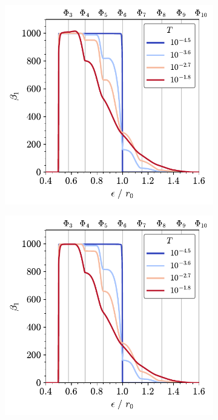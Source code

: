 \begin{figure}[tb]
	\centering
     
      \begin{subfigure}[b]{0.45\textwidth}
         \centering
         \includegraphics[width=\textwidth]{./figures/ph/tri_raft_beta1_full.pdf}
         \caption{}
         \label{fig:trbettia}
     \end{subfigure}
     \hfill
     \begin{subfigure}[b]{0.45\textwidth}
         \centering
         \includegraphics[width=\textwidth]{./figures/ph/tri_raft_beta1_cut.pdf}
         \caption{}
         \label{fig:trbettib}
     \end{subfigure}


\end{figure}
